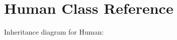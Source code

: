 \hypertarget{classHuman}{}\section{Human Class Reference}
\label{classHuman}


Inheritance diagram for Human\+:
